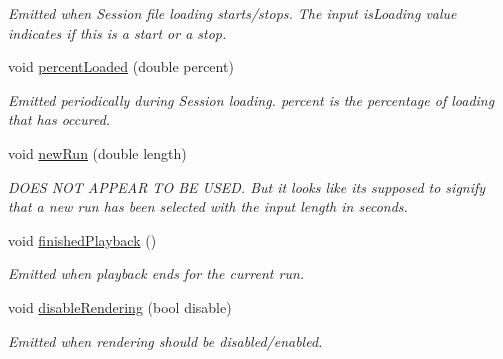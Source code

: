 \begin{DoxyCompactItemize}
\begin{DoxyCompactList}\small\item\em Emitted when Session file loading starts/stops. The input is\-Loading value indicates if this is a start or a stop. \end{DoxyCompactList}\item 
\hypertarget{class_picto_1_1_playback_state_updater_ab26fe31cbc86b15a22a21081b31b8fc3}{void \hyperlink{class_picto_1_1_playback_state_updater_ab26fe31cbc86b15a22a21081b31b8fc3}{percent\-Loaded} (double percent)}\label{class_picto_1_1_playback_state_updater_ab26fe31cbc86b15a22a21081b31b8fc3}

\begin{DoxyCompactList}\small\item\em Emitted periodically during Session loading. percent is the percentage of loading that has occured. \end{DoxyCompactList}\item 
\hypertarget{class_picto_1_1_playback_state_updater_a17b85aab4f6fb573def77d79a29398b1}{void \hyperlink{class_picto_1_1_playback_state_updater_a17b85aab4f6fb573def77d79a29398b1}{new\-Run} (double length)}\label{class_picto_1_1_playback_state_updater_a17b85aab4f6fb573def77d79a29398b1}

\begin{DoxyCompactList}\small\item\em D\-O\-E\-S N\-O\-T A\-P\-P\-E\-A\-R T\-O B\-E U\-S\-E\-D. But it looks like its supposed to signify that a new run has been selected with the input length in seconds. \end{DoxyCompactList}\item 
\hypertarget{class_picto_1_1_playback_state_updater_af06ac849db666c605e1706960b12cd58}{void \hyperlink{class_picto_1_1_playback_state_updater_af06ac849db666c605e1706960b12cd58}{finished\-Playback} ()}\label{class_picto_1_1_playback_state_updater_af06ac849db666c605e1706960b12cd58}

\begin{DoxyCompactList}\small\item\em Emitted when playback ends for the current run. \end{DoxyCompactList}\item 
void \hyperlink{class_picto_1_1_playback_state_updater_afa95cc3a7575a8b7f1604b48c46dbc8c}{disable\-Rendering} (bool disable)
\begin{DoxyCompactList}\small\item\em Emitted when rendering should be disabled/enabled. \end{DoxyCompactList}\end{DoxyCompactItemize}
